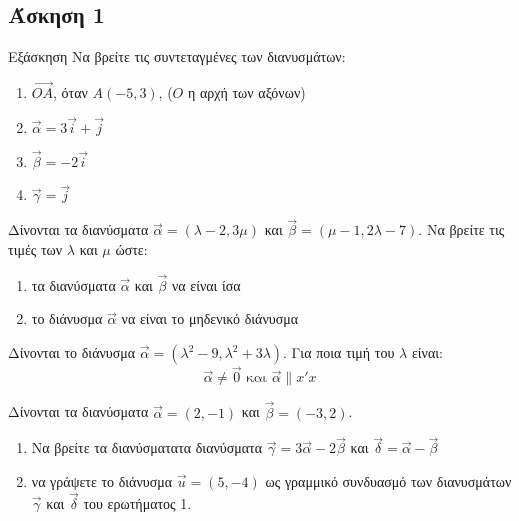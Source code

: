\documentclass[greek]{beamer}
\begin{document}
\subsection{Άσκηση 1}
\begin{frame}[label=Άσκηση1,t]{Εξάσκηση}
  Να βρείτε τις συντεταγμένες των διανυσμάτων:
  \begin{enumerate}
    \item<1-> $\overrightarrow{ΟΑ}$, όταν $Α(-5,3)$, ($Ο$ η αρχή των αξόνων)
    \item<2-> $\vec{α}=3\vec{i}+\vec{j}$
    \item<3-> $\vec{β}=-2\vec{i}$
    \item<4-> $\vec{γ}=\vec{j}$
  \end{enumerate}
\end{frame}

\begin{askisi}
  Δίνονται τα διανύσματα $\vec{α}=(λ-2,3μ)$ και $\vec{β}=(μ-1,2λ-7)$. Να βρείτε τις τιμές των $λ$ και $μ$ ώστε:
  \begin{enumerate}
    \item<1-> τα διανύσματα $\vec{α}$ και $\vec{β}$ να είναι ίσα
    \item<2-> το διάνυσμα $\vec{α}$ να είναι το μηδενικό διάνυσμα
  \end{enumerate}

\end{askisi}

\begin{askisi}
  Δίνονται το διάνυσμα $\vec{α}=(λ^2-9,λ^2+3λ)$. Για ποια τιμή του $λ$ είναι:
  $$\vec{α}\ne \vec{0} \text{ και } \vec{α}\parallel x'x$$

\end{askisi}

\begin{askisi}
  Δίνονται τα διανύσματα $\vec{α}=(2,-1)$ και $\vec{β}=(-3,2)$.
  \begin{enumerate}
    \item<1-> Να βρείτε τα διανύσματατα διανύσματα $\vec{γ}=3\vec{α}-2\vec{β}$ και $\vec{δ}=\vec{α}-\vec{β}$
    \item<2-> να γράψετε το διάνυσμα $\vec{u}=(5,-4)$ ως γραμμικό συνδυασμό των διανυσμάτων $\vec{γ}$ και $\vec{δ}$ του ερωτήματος 1.
  \end{enumerate}

\end{askisi}
\end{document}
